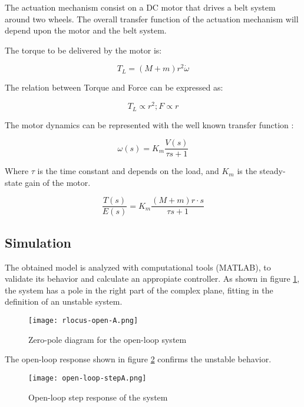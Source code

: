 The actuation mechanism consist on a DC motor that drives a belt system around two wheels. The overall transfer function of the actuation mechanism will depend upon the motor and the belt system.

The torque to be delivered by the motor is:

\begin{equation} \label{t}
	T_L=(M+m)r^2\dot{\omega}
\end{equation}

The relation between Torque and Force can be expressed as:

\begin{equation} \label{dtf}
	T_L\propto r^2 ; F\propto r
\end{equation}

The motor dynamics can be represented with the well known transfer function \cite{SUL03} \cite{ZAC17}:

\begin{equation} \label{md}
	\omega(s)=K_m\frac{V(s)}{\tau s+1}
\end{equation}

Where $\tau$ is the time constant and depends on the load, and $K_m$ is the steady-state gain of the motor.

\begin{equation} \label{mtf}
	\frac{T(s)}{E(s)}=K_m\frac{(M+m)r\cdot s}{\tau s+1}
\end{equation}

\subsection{Simulation}

The obtained model is analyzed with computational tools (MATLAB), to validate its behavior and calculate an appropiate controller. As shown in figure \ref{fig:zpopenA}, the system has a pole in the right part of the complex plane, fitting in the definition of an unstable system.

\begin{figure}[h]
	\centering
	\texttt{[image: rlocus-open-A.png]}
	\caption{Zero-pole diagram for the open-loop system}\label{fig:zpopenA}
\end{figure}

The open-loop response shown in figure \ref{fig:openrespA} confirms the unstable behavior.

\begin{figure}[h]
	\centering
	\texttt{[image: open-loop-stepA.png]}
	\caption{Open-loop step response of the system}\label{fig:openrespA}
\end{figure}


